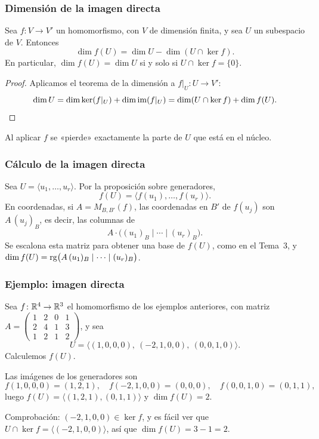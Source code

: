 \begin{frame}
    \frametitle{Dimensión de la imagen directa}

    \begin{proposition}
        Sea $f\colon V\to V'$ un homomorfismo, con $V$ de dimensión finita,
        y sea $U$ un subespacio de $V$. Entonces
        \[
            \dim f(U)=\dim U-\dim(U\cap\ker f).
        \]
        En particular, $\dim f(U)=\dim U$ si y solo si
        $U\cap\ker f=\{0\}$.
    \end{proposition}

    \begin{proof}
        Aplicamos el teorema de la dimensión a $f|_U\colon U\to V'$:
        \[
            \dim U=\dim\ker(f|_U)+\dim\operatorname{im}(f|_U)
            =\dim(U\cap\ker f)+\dim f(U).\qedhere
        \]
    \end{proof}

    \medskip

    Al aplicar $f$ se «pierde» exactamente la parte de $U$ que está en
    el núcleo.
\end{frame}


\begin{frame}
    \frametitle{Cálculo de la imagen directa}

    Sea $U=\langle u_1,\ldots,u_r\rangle$. Por la proposición sobre
    generadores,
    \[
        f(U)=\langle f(u_1),\ldots,f(u_r)\rangle.
    \]
    En coordenadas, si $A=M_{B,B'}(f)$, las coordenadas en $B'$ de
    $f(u_j)$ son $A\,(u_j)_B$, es decir, las columnas de
    \[
        A\cdot\bigl((u_1)_B\mid\cdots\mid(u_r)_B\bigr).
    \]
    Se escalona esta matriz para obtener una base de $f(U)$, como en el
    Tema~3, y $\dim f(U)=\operatorname{rg}\bigl(A\,(u_1)_B\mid\cdots\mid(u_r)_B\bigr)$.
\end{frame}


\begin{frame}
    \frametitle{Ejemplo: imagen directa}

    \begin{example}
        Sea $f\colon\mathbb{R}^4\to\mathbb{R}^3$ el homomorfismo de los ejemplos
        anteriores, con matriz
        $A=\begin{pmatrix}1&2&0&1\\2&4&1&3\\1&2&1&2\end{pmatrix}$, y sea
        \[
            U=\langle(1,0,0,0),\ (-2,1,0,0),\ (0,0,1,0)\rangle.
        \]
        Calculemos $f(U)$.
    \end{example}

    Las imágenes de los generadores son
    \[
        f(1,0,0,0)=(1,2,1),\quad
        f(-2,1,0,0)=(0,0,0),\quad
        f(0,0,1,0)=(0,1,1),
    \]
    luego $f(U)=\langle(1,2,1),(0,1,1)\rangle$ y $\dim f(U)=2$.

    \medskip

    Comprobación: $(-2,1,0,0)\in\ker f$, y es fácil ver que
    $U\cap\ker f=\langle(-2,1,0,0)\rangle$, así que
    $\dim f(U)=3-1=2$.
\end{frame}



